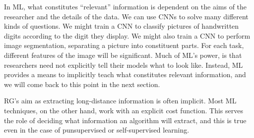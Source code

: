 In ML, what constitutes ``relevant'' information is dependent on the
aims of the researcher and the details of the data. We can use CNNs to
solve many different kinds of questions.  We might train a CNN to
classify pictures of handwritten digits according to the digit they
display. We might also train a CNN to perform image segmentation,
separating a picture into constituent parts. For each task, different
features of the image will be significant.  Much of ML's power, is
that researchers need not explicitly tell their models what to look
like. Instead, ML provides a means to implicitly teach what
constitutes relevant information, and we will come back to this point
in the next section.


RG's aim as extracting long-distance information is often
implicit. Most ML techniques, on the other hand, work with an explicit
cost function. This serves the role of deciding what information an
algorithm will extract, and this is true even in the case of
punsupervised or self-supervised learning.
